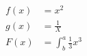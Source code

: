\documentclass{article}
\begin{document}
	\begin{align*}
		f(x) &= x^2\\
		g(x) &= \frac{1}{X}\\
		F(x) &= \int^a_b\frac{1}{3}x^3
	\end{align*}
\end{document}
